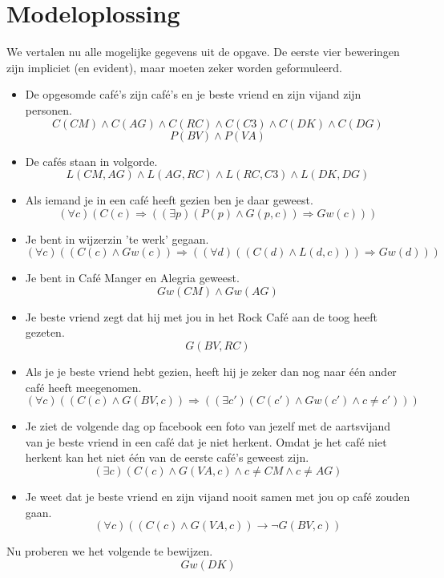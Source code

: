 \documentclass[alternative-exam.tex]{subfiles}
\begin{document}
\section{Modeloplossing}
We vertalen nu alle mogelijke gegevens uit de opgave. De eerste vier beweringen zijn impliciet (en evident), maar moeten zeker worden geformuleerd.
\begin{itemize}
\item De opgesomde caf\'e's zijn caf\'e's en je beste vriend en zijn vijand zijn personen.
\[ C(CM)\wedge C(AG)\wedge C(RC)\wedge C(C3)\wedge C(DK)\wedge C(DG) \]
\[ P(BV) \wedge P(VA)\]
\item De caf\'es staan in volgorde.
\[
L(CM,AG) \wedge L(AG,RC) \wedge L(RC,C3) \wedge L(DK,DG) 
\]
\item Als iemand je in een caf\'e heeft gezien ben je daar geweest.
\[
(\forall c)(C(c) \Rightarrow ((\exists p) (P(p) \wedge G(p,c)) \Rightarrow Gw(c)))
\]
\item Je bent in wijzerzin 'te werk' gegaan.
\[
(\forall c)(( C(c) \wedge Gw(c)) \Rightarrow ((\forall d)(( C(d) \wedge L(d,c)))\Rightarrow Gw(d)))
\]
\item Je bent in Caf\'e Manger en Alegria geweest.
\[
Gw(CM) \wedge Gw(AG)
\]
\item Je beste vriend zegt dat hij met jou in het Rock Caf\'e aan de toog heeft gezeten.
\[
G(BV,RC)
\]
\item Als je je beste vriend hebt gezien, heeft hij je zeker dan nog naar \'e\'en ander caf\'e heeft meegenomen.
\[
(\forall c) ((C(c) \wedge G(BV,c)) \Rightarrow ((\exists c') (C(c') \wedge Gw(c') \wedge c \neq c')))
\]
\item Je ziet de volgende dag op facebook een foto van jezelf met de aartsvijand van je beste vriend in een caf\'e dat je niet herkent. Omdat je het caf\'e niet herkent kan het niet \'e\'en van de eerste caf\'e's geweest zijn. 
\[
(\exists c) (C(c) \wedge G(VA,c) \wedge c\neq CM \wedge c \neq AG)
\]
\item Je weet dat je beste vriend en zijn vijand nooit samen met jou op caf\'e zouden gaan.
\[
(\forall c) ((C(c) \wedge G(VA,c)) \rightarrow \neg G(BV,c))
\]
\end{itemize}
Nu proberen we het volgende te bewijzen.
\[
Gw(DK)
\]
\end{document}
